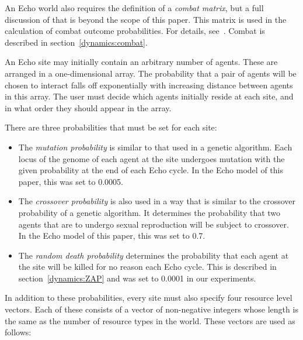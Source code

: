 An Echo world also requires the definition of a {\em combat matrix},
but a full discussion of that is beyond the scope of this paper.
This matrix is used in the calculation of combat outcome
probabilities. For details, see~\cite{Holland92}. Combat is described
in section~\ref{dynamics:combat}.



An Echo site may initially contain an arbitrary number of agents.
These are arranged in a one-dimensional array. The probability that a
pair of agents will be chosen to interact falls off exponentially with
increasing distance between agents in this array. The user must decide
which agents initially reside at each site, and in what order they
should appear in the array.

There are three probabilities that must be set for each site:

\begin{itemize}
\item
The {\em mutation probability\/} is similar to that used in a genetic
algorithm.
Each locus of the genome of each agent at the site undergoes mutation
with the given probability at the end of each Echo cycle. In the Echo
model of this paper, this was set to 0.0005.

\item
The {\em crossover probability\/} is also used in a way that is
similar to the crossover probability of a genetic algorithm. It
determines the probability that two agents that are to undergo sexual
reproduction will be subject to crossover. In the Echo
model of this paper, this was set to 0.7.

\item
The {\em random death probability\/} determines the probability that
each agent at the site will be killed for no reason each Echo cycle.
This is described in section~\ref{dynamics:ZAP} and was set to 0.0001
in our experiments.
\end{itemize}

In addition to these probabilities, every site must also specify four
resource level vectors. Each of these consists of a vector of
non-negative integers whose length is the same as the number of
resource types in the world.  These vectors are used as follows:

